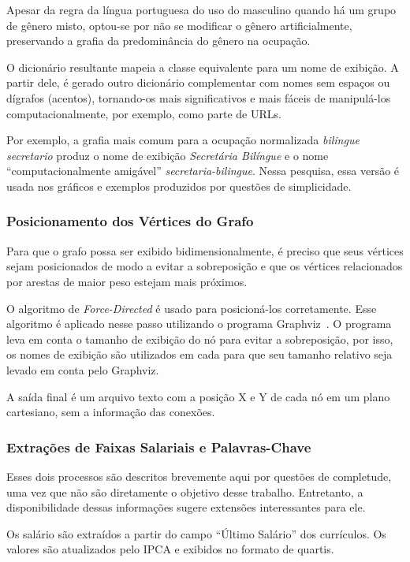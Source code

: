 \documentclass[12pt,a4paper]{article}
\begin{document}
Apesar da regra da língua portuguesa do uso do masculino quando há um grupo de gênero misto, optou-se por não se modificar o gênero artificialmente, preservando a grafia da predominância do gênero na ocupação.

O dicionário resultante mapeia a classe equivalente para um nome de exibição. A partir dele, é gerado outro dicionário complementar com nomes sem espaços ou dígrafos (acentos), tornando-os mais significativos e mais fáceis de manipulá-los computacionalmente, por exemplo, como parte de URLs.

Por exemplo, a grafia mais comum para a ocupação normalizada \textit{bilingue secretario} produz o nome de exibição \textit{Secretária Bilíngue} e o nome \enquote{computacionalmente amigável} \textit{secretaria-bilingue}. Nessa pesquisa, essa versão é usada nos gráficos e exemplos produzidos por questões de simplicidade.


\subsubsection{Posicionamento dos Vértices do Grafo}

Para que o grafo possa ser exibido bidimensionalmente, é preciso que seus vértices sejam posicionados de modo a evitar a sobreposição e que os vértices relacionados por arestas de maior peso estejam mais próximos.

O algoritmo de \textit{Force-Directed} é usado para posicioná-los corretamente. Esse algoritmo é aplicado nesse passo utilizando o programa Graphviz~\cite{Gansner2000-oo}. O programa leva em conta o tamanho de exibição do nó para evitar a sobreposição, por isso, os nomes de exibição são utilizados em cada para que seu tamanho relativo seja levado em conta pelo Graphviz.

A saída final é um arquivo texto com a posição X e Y de cada nó em um plano cartesiano, sem a informação das conexões.


\subsubsection{Extrações de Faixas Salariais e Palavras-Chave}

Esses dois processos são descritos brevemente aqui por questões de completude, uma vez que não são diretamente o objetivo desse trabalho. Entretanto, a disponibilidade dessas informações sugere extensões interessantes para ele.

Os salário são extraídos a partir do campo \enquote{Último Salário} dos currículos. Os valores são atualizados pelo IPCA e exibidos no formato de quartis.
\end{document}
